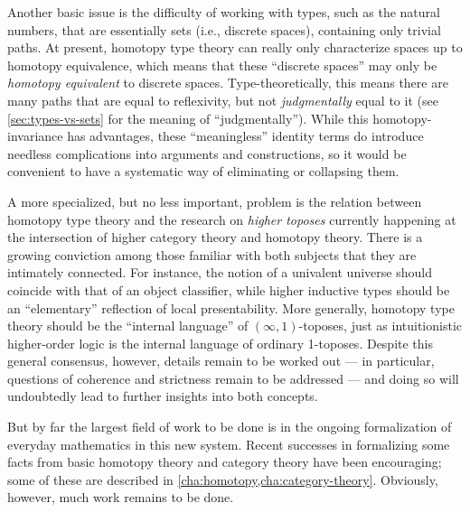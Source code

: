 Another basic issue is the difficulty of working with types, such as the natural numbers, that are essentially sets (i.e., discrete spaces),
%
containing only trivial paths.
At present, homotopy type theory can really only characterize spaces up to homotopy equivalence, which means that these ``discrete spaces'' may only be \emph{homotopy equivalent} to discrete spaces.
Type-theoretically, this means there are many paths that are equal to reflexivity, but not \emph{judgmentally} equal to it (see \cref{sec:types-vs-sets} for the meaning of ``judgmentally'').
While this homotopy-invariance has advantages, these ``meaningless'' identity terms do introduce needless complications into arguments and constructions, so it would be convenient to have a systematic way of eliminating or collapsing them.

A more specialized, but no less important, problem is the relation between homotopy type theory and the research on \emph{higher toposes}%
currently happening at the intersection of higher category theory and homotopy theory.
There is a growing conviction among those familiar with both subjects that they are intimately connected.
For instance, the notion of a univalent universe should coincide with that of an object classifier, while higher inductive types should be an ``elementary'' reflection of local presentability.
More generally, homotopy type theory should be the ``internal language'' of $(\infty,1)$-toposes, just as intuitionistic higher-order logic is the internal language of ordinary 1-toposes.
Despite this general consensus, however, details remain to be worked out --- in particular, questions of coherence and strictness remain to be addressed  --- and doing so will undoubtedly lead to further insights into both concepts.

%
But by far the largest field of work to be done is in the ongoing formalization of everyday mathematics in this new system.
Recent successes in formalizing some facts from basic homotopy theory and category theory have been encouraging; some of these are described in \cref{cha:homotopy,cha:category-theory}.
Obviously, however, much work remains to be done.

%

